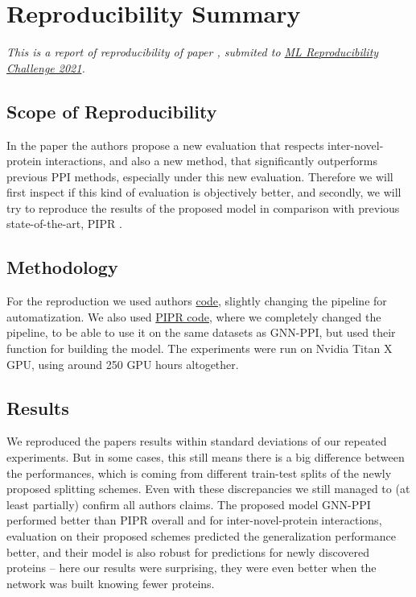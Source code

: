 \section{Reproducibility Summary}

\textit{This is a report of reproducibility of paper \cite{lv2021learning}, submited to  \href{https://paperswithcode.com/rc2021}{ML Reproducibility Challenge 2021}.}

\subsection*{Scope of Reproducibility}

In the paper the authors
propose a new evaluation that respects inter-novel-protein interactions, and also a new method, that significantly outperforms previous PPI methods, especially under this new evaluation. Therefore we will first inspect if this kind of evaluation is objectively better, 
and secondly, we will try to reproduce the results of the proposed model in comparison with previous state-of-the-art, PIPR \cite{chen2019pipr}.

\subsection*{Methodology}

For the reproduction we used authors \href{https://github.com/lvguofeng/GNN_PPI}{code}, slightly changing the pipeline for automatization. We also used \href{https://github.com/muhaochen/seq_ppi}{PIPR code}, where we completely changed the pipeline, to be able to use it on the same datasets as GNN-PPI, but used their function for building the model. 
The experiments were run on Nvidia Titan X GPU, using around 250 GPU hours altogether.

\subsection*{Results}
We reproduced the papers results within standard deviations of our repeated experiments. But in some cases, this still means there is a big difference between the performances, which is coming from different train-test splits of the newly proposed splitting schemes. Even with these discrepancies we still managed to (at least partially) confirm all authors claims. The proposed model GNN-PPI performed better than PIPR overall and for inter-novel-protein interactions, evaluation on their proposed schemes predicted the generalization performance better, and their model is also robust for predictions for newly discovered proteins -- here our results were surprising, they were even better when the network was built knowing fewer proteins.



